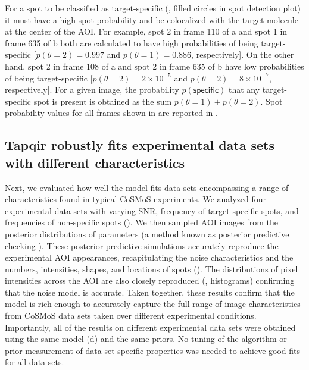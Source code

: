 For a spot to be classified as target-specific (, filled circles in spot detection plot) it must have a high spot probability and be colocalized with the target molecule at the center of the AOI. For example, spot 2 in frame 110 of a and spot 1 in frame 635 of b both are calculated to have high probabilities of being target-specific [$p(\theta=2) = 0.997$ and $p(\theta=1) = 0.886$, respectively]. On the other hand, spot 2 in frame 108 of a and spot 2 in frame 635 of b have low probabilities of being target-specific [$p(\theta=2) = 2 \times 10^{-5}$ and $p(\theta=2) = 8 \times 10^{-7}$, respectively]. For a given image, the probability $p(\mathsf{specific})$ that any target-specific spot is present is obtained as the sum $p(\theta=1) + p(\theta=2)$. Spot probability values for all frames shown in  are reported in .  

\subsection{Tapqir robustly fits experimental data sets with different characteristics}

Next, we evaluated how well the model fits data sets encompassing a range of characteristics found in typical CoSMoS experiments. We analyzed four experimental data sets with varying SNR, frequency of target-specific spots, and frequencies of non-specific spots (). We then sampled AOI images from the posterior distributions of parameters (a method known as posterior predictive checking \citep{Gelman2013-ro}). These posterior predictive simulations accurately reproduce the experimental AOI appearances, recapitulating the noise characteristics and the numbers, intensities, shapes, and locations of spots ().  The distributions of pixel intensities across the AOI are also closely reproduced (, histograms) confirming that the noise model is accurate. Taken together, these results confirm that the model is rich enough to accurately capture the full range of image characteristics from CoSMoS data sets taken over different experimental conditions.  Importantly, all of the results on different experimental data sets were obtained using the same model (d) and the same priors.  No tuning of the algorithm or prior measurement of data-set-specific properties was needed to achieve good fits for all data sets.

